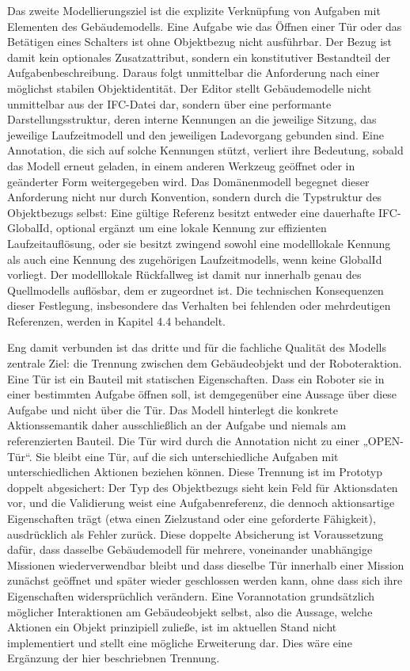 Das zweite Modellierungsziel ist die explizite Verknüpfung von Aufgaben mit Elementen des
Gebäudemodells. Eine Aufgabe wie das Öffnen einer Tür oder das Betätigen eines Schalters ist ohne
Objektbezug nicht ausführbar. Der Bezug ist damit kein optionales Zusatzattribut, sondern ein
konstitutiver Bestandteil der Aufgabenbeschreibung. Daraus folgt unmittelbar die Anforderung nach
einer möglichst stabilen Objektidentität. Der Editor stellt Gebäudemodelle nicht unmittelbar aus der
IFC-Datei dar, sondern über eine performante Darstellungsstruktur, deren interne Kennungen an die
jeweilige Sitzung, das jeweilige Laufzeitmodell und den jeweiligen Ladevorgang gebunden sind. Eine
Annotation, die sich auf solche Kennungen stützt, verliert ihre Bedeutung, sobald das Modell erneut
geladen, in einem anderen Werkzeug geöffnet oder in geänderter Form weitergegeben wird. Das
Domänenmodell begegnet dieser Anforderung nicht nur durch Konvention, sondern durch die Typstruktur
des Objektbezugs selbst: Eine gültige Referenz besitzt entweder eine dauerhafte IFC-GlobalId,
optional ergänzt um eine lokale Kennung zur effizienten Laufzeitauflösung, oder sie besitzt zwingend
sowohl eine modelllokale Kennung als auch eine Kennung des zugehörigen Laufzeitmodells, wenn keine
GlobalId vorliegt. Der modelllokale Rückfallweg ist damit nur innerhalb genau des Quellmodells
auflösbar, dem er zugeordnet ist. Die technischen Konsequenzen dieser Festlegung, insbesondere das
Verhalten bei fehlenden oder mehrdeutigen Referenzen, werden in Kapitel 4.4 behandelt.

Eng damit verbunden ist das dritte und für die fachliche Qualität des Modells zentrale Ziel: die
Trennung zwischen dem Gebäudeobjekt und der Roboteraktion. Eine Tür ist ein Bauteil mit statischen
Eigenschaften. Dass ein Roboter sie in einer bestimmten Aufgabe öffnen soll, ist demgegenüber eine
Aussage über diese Aufgabe und nicht über die Tür. Das Modell hinterlegt die konkrete
Aktionssemantik daher ausschließlich an der Aufgabe und niemals am referenzierten Bauteil. Die Tür
wird durch die Annotation nicht zu einer „OPEN-Tür“. Sie bleibt eine Tür, auf die sich
unterschiedliche Aufgaben mit unterschiedlichen Aktionen beziehen können. Diese Trennung ist im
Prototyp doppelt abgesichert: Der Typ des Objektbezugs sieht kein Feld für Aktionsdaten vor, und die
Validierung weist eine Aufgabenreferenz, die dennoch aktionsartige Eigenschaften trägt (etwa einen
Zielzustand oder eine geforderte Fähigkeit), ausdrücklich als Fehler zurück. Diese doppelte
Absicherung ist Voraussetzung dafür, dass dasselbe Gebäudemodell für mehrere, voneinander
unabhängige Missionen wiederverwendbar bleibt und dass dieselbe Tür innerhalb einer Mission zunächst
geöffnet und später wieder geschlossen werden kann, ohne dass sich ihre Eigenschaften
widersprüchlich verändern. Eine Vorannotation grundsätzlich möglicher Interaktionen am Gebäudeobjekt
selbst, also die Aussage, welche Aktionen ein Objekt prinzipiell zuließe, ist im aktuellen Stand
nicht implementiert und stellt eine mögliche Erweiterung dar. Dies wäre eine Ergänzung der hier beschriebnen 
Trennung.

